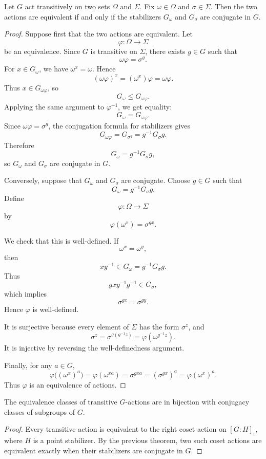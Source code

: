 \begin{theorem}
Let \(G\) act transitively on two sets \(\Omega\) and \(\Sigma\). Fix \(\omega\in\Omega\) and \(\sigma\in\Sigma\). Then the two actions are equivalent if and only if the stabilizers \(G_\omega\) and \(G_\sigma\) are conjugate in \(G\).
\end{theorem}

\begin{proof}
Suppose first that the two actions are equivalent. Let
\[
    \varphi:\Omega\longrightarrow \Sigma
\]
be an equivalence. Since \(G\) is transitive on \(\Sigma\), there exists \(g\in G\) such that
\[
    \omega\varphi=\sigma^g.
\]
For \(x\in G_\omega\), we have \(\omega^x=\omega\). Hence
\[
    (\omega\varphi)^x
    =
    (\omega^x)\varphi
    =
    \omega\varphi.
\]
Thus \(x\in G_{\omega\varphi}\), so
\[
    G_\omega\leq G_{\omega\varphi}.
\]
Applying the same argument to \(\varphi^{-1}\), we get equality:
\[
    G_\omega=G_{\omega\varphi}.
\]
Since \(\omega\varphi=\sigma^g\), the conjugation formula for stabilizers gives
\[
    G_{\omega\varphi}
    =
    G_{\sigma^g}
    =
    g^{-1}G_\sigma g.
\]
Therefore
\[
    G_\omega=g^{-1}G_\sigma g,
\]
so \(G_\omega\) and \(G_\sigma\) are conjugate in \(G\).

Conversely, suppose that \(G_\omega\) and \(G_\sigma\) are conjugate. Choose \(g\in G\) such that
\[
    G_\omega=g^{-1}G_\sigma g.
\]
Define
\[
    \varphi:\Omega\longrightarrow \Sigma
\]
by
\[
    \varphi(\omega^x)=\sigma^{gx}.
\]

We check that this is well-defined. If
\[
    \omega^x=\omega^y,
\]
then
\[
    xy^{-1}\in G_\omega=g^{-1}G_\sigma g.
\]
Thus
\[
    gxy^{-1}g^{-1}\in G_\sigma,
\]
which implies
\[
    \sigma^{gx}=\sigma^{gy}.
\]
Hence \(\varphi\) is well-defined.

It is surjective because every element of \(\Sigma\) has the form \(\sigma^z\), and
\[
    \sigma^z=\sigma^{g(g^{-1}z)}=\varphi(\omega^{g^{-1}z}).
\]
It is injective by reversing the well-definedness argument.

Finally, for any \(a\in G\),
\[
    \varphi\bigl((\omega^x)^a\bigr)
    =
    \varphi(\omega^{xa})
    =
    \sigma^{gxa}
    =
    (\sigma^{gx})^a
    =
    \varphi(\omega^x)^a.
\]
Thus \(\varphi\) is an equivalence of actions.
\end{proof}

\begin{corollary}
The equivalence classes of transitive \(G\)-actions are in bijection with conjugacy classes of subgroups of \(G\).
\end{corollary}

\begin{proof}
Every transitive action is equivalent to the right coset action on \([G:H]_{\mathrm r}\), where \(H\) is a point stabilizer. By the previous theorem, two such coset actions are equivalent exactly when their stabilizers are conjugate in \(G\).
\end{proof}
